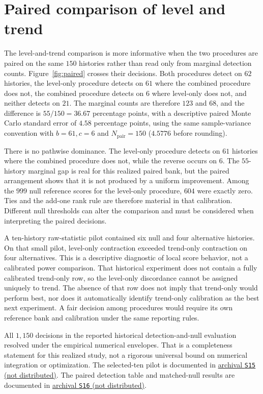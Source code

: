 \section{Paired comparison of level and trend}

The level-and-trend comparison is more informative when the two procedures are paired on the same \(150\) histories rather than read only from marginal detection counts. Figure~\ref{fig:paired} crosses their decisions. Both procedures detect on \(62\) histories, the level-only procedure detects on \(61\) where the combined procedure does not, the combined procedure detects on \(6\) where level-only does not, and neither detects on \(21\). The marginal counts are therefore \(123\) and \(68\), and the difference is \(55/150=36.67\) percentage points, with a descriptive paired Monte Carlo standard error of \(4.58\) percentage points, using the same sample-variance convention with \(b=61,c=6\) and \(N_{\mathrm{pair}}=150\) (\(4.5776\) before rounding).

There is no pathwise dominance. The level-only procedure detects on \(61\) histories where the combined procedure does not, while the reverse occurs on \(6\). The \(55\)-history marginal gap is real for this realized paired bank, but the paired arrangement shows that it is not produced by a uniform improvement. Among the \(999\) null reference scores for the level-only procedure, \(604\) were exactly zero. Ties and the add-one rank rule are therefore material in that calibration. Different null thresholds can alter the comparison and must be considered when interpreting the paired decisions.

A ten-history raw-statistic pilot contained six null and four alternative histories. On that small pilot, level-only contraction exceeded trend-only contraction on four alternatives. This is a descriptive diagnostic of local score behavior, not a calibrated power comparison. That historical experiment does not contain a fully calibrated trend-only row, so the level-only discordance cannot be assigned uniquely to trend. The absence of that row does not imply that trend-only would perform best, nor does it automatically identify trend-only calibration as the best next experiment. A fair decision among procedures would require its own reference bank and calibration under the same reporting rules.

All \(1{,}150\) decisions in the reported historical detection-and-null evaluation resolved under the empirical numerical envelopes. That is a completeness statement for this realized study, not a rigorous universal bound on numerical integration or optimization. The selected-ten pilot is documented in \hyperlink{S15}{archival \texttt{S15} (not distributed)}. The paired detection table and matched-null results are documented in \hyperlink{S16}{archival \texttt{S16} (not distributed)}.


